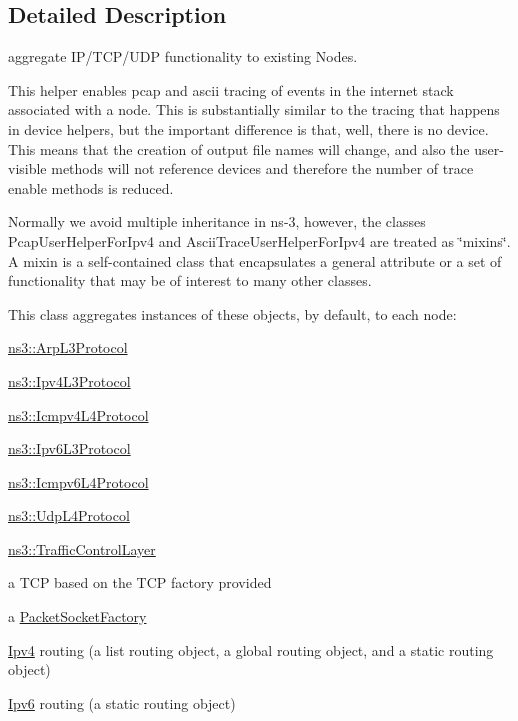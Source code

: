 \subsection{Detailed Description}
aggregate I\+P/\+T\+C\+P/\+U\+DP functionality to existing Nodes. 

This helper enables pcap and ascii tracing of events in the internet stack associated with a node. This is substantially similar to the tracing that happens in device helpers, but the important difference is that, well, there is no device. This means that the creation of output file names will change, and also the user-\/visible methods will not reference devices and therefore the number of trace enable methods is reduced.

Normally we avoid multiple inheritance in ns-\/3, however, the classes Pcap\+User\+Helper\+For\+Ipv4 and Ascii\+Trace\+User\+Helper\+For\+Ipv4 are treated as \char`\"{}mixins\char`\"{}. A mixin is a self-\/contained class that encapsulates a general attribute or a set of functionality that may be of interest to many other classes.

This class aggregates instances of these objects, by default, to each node\+:
\begin{DoxyItemize}
\item \hyperlink{classns3_1_1ArpL3Protocol}{ns3\+::\+Arp\+L3\+Protocol}
\item \hyperlink{classns3_1_1Ipv4L3Protocol}{ns3\+::\+Ipv4\+L3\+Protocol}
\item \hyperlink{classns3_1_1Icmpv4L4Protocol}{ns3\+::\+Icmpv4\+L4\+Protocol}
\item \hyperlink{classns3_1_1Ipv6L3Protocol}{ns3\+::\+Ipv6\+L3\+Protocol}
\item \hyperlink{classns3_1_1Icmpv6L4Protocol}{ns3\+::\+Icmpv6\+L4\+Protocol}
\item \hyperlink{classns3_1_1UdpL4Protocol}{ns3\+::\+Udp\+L4\+Protocol}
\item \hyperlink{classns3_1_1TrafficControlLayer}{ns3\+::\+Traffic\+Control\+Layer}
\item a T\+CP based on the T\+CP factory provided
\item a \hyperlink{classns3_1_1PacketSocketFactory}{Packet\+Socket\+Factory}
\item \hyperlink{classns3_1_1Ipv4}{Ipv4} routing (a list routing object, a global routing object, and a static routing object)
\item \hyperlink{classns3_1_1Ipv6}{Ipv6} routing (a static routing object) 
\end{DoxyItemize}

